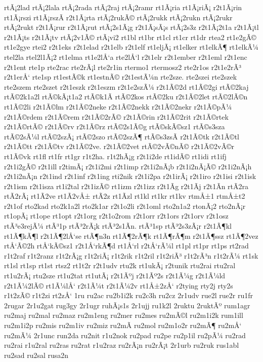{rtÃ¡2lad
rtÃ¡2lala
rtÃ¡2rada
rtÃ¡2raj
rtÃ¡2ramr
rt1Ã¡ria
rt1Ã¡riÃ¡
r2t1Ã¡rin
rt1Ã¡rszi
rt1Ã¡rszÃ­
r2t1Ã¡rta
rtÃ¡2rukÃ©
rtÃ¡2rukk
rtÃ¡2rukn
rtÃ¡2rukr
rtÃ¡2rukt
r2t1Ã¡rur
r2t1Ã¡rut
rtÃ¡2s1Ã¡g
r2t1Ã¡sÃ¡s
rtÃ¡2s3z
r2t1Ã¡2t1a
r2t1Ã¡tl
r2t1Ã¡ts
r2t1Ã¡tv
rtÃ¡2v1Ã©
rtÃ¡vi2
rt1bl
rt1br
rt1cl
rt1cr
rt1dr
rtea2
rt1e2gÃ©
rt1e2gye
rtei2
r2t1eks
r2t1elad
r2t1elb
r2t1elf
rt1eljÃ¡
rt1elker
rt1elkÃ¶
rt1elkÃ¼
rtel2la
rtel2l1Ã¡2
rt1elma
rt1e2lÅ‘a
rte2lÅ‘l
r2t1elr
r2t1ember
r2t1eml
r2t1enc
r2t1ent
rte1p
rte2rac
rte2rÃ¡l
rte2r1in
rtermo1
rtermosz2
rte2r1os
r2t1e2rÃ³
r2t1erÅ‘
rte1sp
rt1estÃ©k
rt1estnÃ©
r2t1estÃ¼n
rte2sze.
rte2szei
rte2szek
rte2szem
rte2szet
r2t1eszk
r2t1eszm
r2t1e2szÃ¼
r2t1Ã©2d
rt1Ã©2gi
rtÃ©2kaj
rtÃ©2k1a2l
rtÃ©kÃ¡t1a2
rtÃ©k1Ã­
rtÃ©2kos
rtÃ©2ku
r2t1Ã©2let
rtÃ©2lÃ©n
rt1Ã©2li
r2t1Ã©lm
r2t1Ã©2neke
r2t1Ã©2nekk
r2t1Ã©2nekr
r2t1Ã©pÃ¼
r2t1Ã©rdem
r2t1Ã©rem
r2t1Ã©2rÃ©
r2t1Ã©rin
r2t1Ã©2rit
r2t1Ã©rtek
r2t1Ã©rtÃ©
r2t1Ã©rv
r2t1Ã©rz
rtÃ©2s1Ã©g
rtÃ©skÃ©sz1
rtÃ©s3sza
rtÃ©2sÃ¼l
rtÃ©2szÃ¡
rtÃ©2szo
rtÃ©2szÃ¶
rtÃ©s3zsÃ­
r2t1Ã©tk
r2t1Ã©tl
r2t1Ã©tt
r2t1Ã©tv
r2t1Ã©2ve.
r2t1Ã©2vet
rtÃ©2vÃ©nÃ©
r2t1Ã©2vÃ©r
rt1Ã©vk
rt1fl
rt1fr
rt1gr
r1t2ha.
r1t2hÃ¡g
r2t1i2de
rt1idÃ©
rt1idi
rt1ifj
r2t1i2gÃ©
r2t1ill
r2timÃ¡
r2t1i2mi
r2t1imp
r2t1i2nÃ¡b
r2t1i2nÃ¡Ã©
r2t1i2nÃ¡h
r2t1i2nÃ¡n
r2t1ind
r2t1inf
r2t1ing
rti2nik
r2t1i2pa
r2t1irÃ¡
r2t1iro
r2t1isi
r2t1isk
r2t1ism
r2t1isza
rt1i2tal
r2t1izÃ©
rt1izm
r2t1izz
r2t1Ã­g
r2t1Ã­j
r2t1Ã­n
rtÃ­2ra
rtÃ­2rÃ¡
rt1Ã­2ve
rt1Ã­2vÅ±
rtÃ­2z
rt1Ã­zl
rt1kl
rt1kr
rt1kv
rtmÅ±1
rtmÅ±t2
r2t1of
rto2kad
rto2k1a2l
rto2k1ar
r2t1o2li
r2t1oml
rto2n1a2
rtonÃ¡2
rto2nÃ¡r
rt1opÃ¡
rt1ope
rt1opt
r2t1org
r2t1o2rom
r2t1orr
r2t1ors
r2t1orv
r2t1osz
rtÃ³e3rejÃ¼
rtÃ³1p
rtÃ³2rÃ¡k
rtÃ³2s1Ã­n.
rtÃ³1sp
rtÃ³2s3zÃ¡r
r2t1Ã¶kl
rt1Ã¶kÃ¶l
r2t1Ã¶2lÅ‘se
rtÃ¶n3n
rt1Ã¶2rÃ¶k
rt1Ã¶rÃ¶m
r2t1Ã¶ssz
rt1Ã¶2vez
rtÅ‘Ã©2h
rtÅ‘kÃ©sz1
r2t1Å‘rkÃ¶d
rt1Å‘rl
r2tÅ‘rÃ¼l
rt1pl
rt1pr
rt1ps
rt2rad
r1t2raf
r1t2ranz
r1t2rÃ¡g
r1t2riÃ¡
r1t2rik
r1t2ril
r1t2riÃ³
r1t2rÃ³n
r1t2rÃ¼
rt1sk
rt1sl
rt1sp
rt1st
rtsz2
rt1t2r
r2t1udv
rtu2k
rt1ukÃ¡
r2tunik
rtu2rai
rtu2ral
rt1u2rÃ¡
rtu2sze
rt1u2tat
rt1utÃ¡
r2t1Ãºj
r2t1Ãº2s
r2t1Ã¼g
r2t1Ã¼ld
r2t1Ã¼2lÃ©
rt1Ã¼lÅ‘
r2t1Ã¼t
r2t1Ã¼2v
rt1Å±2zÅ‘
r2tying
rty2j
rty2s
r1t2zÃ©
r1t2zi
rt2zÅ‘
1ru
ru2ac
ru2b1i2k
ru2c3h
ru2cz
2r1udv
rue2l
rue2r
ru1fr
2rugar
2r1u2gat
rug3gy
2r1ugr
ruhÃ¡s1s
2r1ujj
ru1k2l
2ruktu
2ruktÃº
rum1agr
ru2maj
ru2mal
ru2maz
ru2m1eng
ru2mer
ru2mes
ru2mÃ©l
ru2m1i2k
rum1ill
ru2m1i2p
ru2mis
ru2m1iv
ru2miz
ru2mÃ­
ru2mol
ru2m1o2r
ru2mÃ¶
ru2mÅ‘
ru2mÃ¼
2r1unc
run2da
ru2nit
r1u2nok
ru2pad
ru2pe
ru2p1il
ru2pÃ¼
ru2rad
ru2rai
r1u2ral
ru2ras
ru2rat
r1u2raz
ru2rÃ¡n
ru2rÃ¡t
2r1urb
ru2ruk
rus1abl
ru2sad
ru2sal
rusa2n
}
